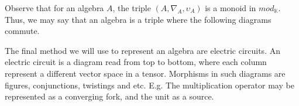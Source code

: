 \documentclass[../thesis.tex]{subfiles}
\begin{document}
            Observe that for an algebra $A$, the triple $(A,\nabla_A,\upsilon_A)$ is a monoid in $mod_{\mathbb{K}}$. Thus, we may say that an algebra is a triple where the following diagrams commute. 
            \begin{center}
                 \quad
            \end{center}
            The final method we will use to represent an algebra are electric circuits. An electric circuit is a diagram read from top to bottom, where each column represent a different vector space in a tensor. Morphisms in such diagrams are figures, conjunctions, twistings and etc. E.g. The multiplication operator may be represented as a converging fork, and the unit as a source.
\end{document}
